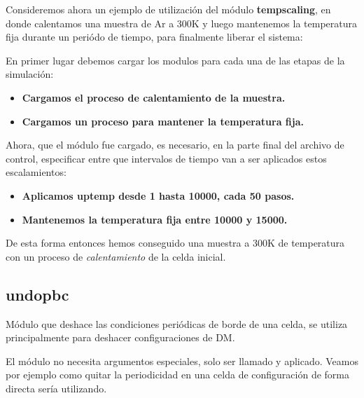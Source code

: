Consideremos ahora un ejemplo de utilizaci\'on del m\'odulo \textbf{tempscaling}, en donde calentamos una muestra de Ar a 300K y luego mantenemos la temperatura fija durante un peri\'odo de tiempo, para finalmente liberar el sistema:

En primer lugar debemos cargar los modulos para cada una de las etapas de la simulaci\'on:

\begin{itemize}
 \item \textbf{Cargamos el proceso de calentamiento de la muestra.}
 \item \textbf{Cargamos un proceso para mantener la temperatura fija.}
\end{itemize}

Ahora, que el m\'odulo fue cargado, es necesario, en la parte final del archivo de control, especificar entre que intervalos de tiempo van a ser aplicados estos escalamientos:

\begin{itemize}
 \item \textbf{Aplicamos \textbf{uptemp} desde 1 hasta 10000, cada 50 pasos.}
 \item \textbf{Mantenemos la temperatura fija entre 10000 y 15000.}
\end{itemize}

De esta forma entonces hemos conseguido una muestra a 300K de temperatura con un proceso de \textit{calentamiento} de la celda inicial.

\subsection{undopbc}
M\'odulo que deshace las condiciones peri\'odicas de borde de una celda, se utiliza principalmente para deshacer configuraciones de DM.

El m\'odulo no necesita argumentos especiales, solo ser llamado y aplicado. Veamos por ejemplo como quitar la periodicidad en una celda de configuraci\'on de forma directa ser\'ia utilizando.


